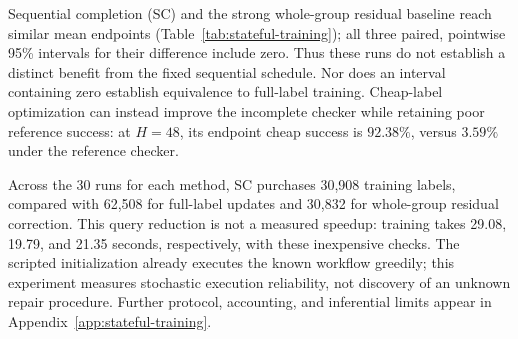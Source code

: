 Sequential completion (SC) and the strong whole-group residual baseline reach similar
mean endpoints (Table~\ref{tab:stateful-training}); all three paired,
pointwise 95\% intervals for their difference include zero. Thus these runs do
not establish a distinct benefit from the fixed sequential schedule. Nor does
an interval containing zero establish equivalence to full-label training.
Cheap-label optimization can instead improve the incomplete checker while
retaining poor reference success: at $H=48$, its endpoint cheap success is
$92.38\%$, versus $3.59\%$ under the reference checker.

Across the 30 runs for each method, SC purchases 30,908 training labels,
compared with 62,508 for full-label updates and 30,832 for whole-group residual
correction. This query reduction is not a measured speedup: training takes
29.08, 19.79, and 21.35 seconds, respectively, with these inexpensive checks.
The scripted initialization already executes the known workflow greedily;
this experiment measures stochastic execution reliability, not discovery of
an unknown repair procedure. Further protocol, accounting, and inferential
limits appear in Appendix~\ref{app:stateful-training}.
